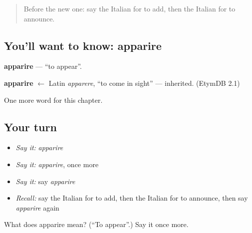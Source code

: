 \label{lesson:IT-C178-apparire}



\begin{quote}
Before the new one: say the Italian for to add, then the Italian for to announce.
\end{quote}

\subsection*{You'll want to know: apparire}
\textbf{apparire} — \textquotedblleft{}to appear\textquotedblright{}.

\begin{cousinweb}
\textbf{apparire} $\leftarrow$ Latin \emph{apparere}, \textquotedblleft{}to come in sight\textquotedblright{} — inherited. (EtymDB 2.1)
\end{cousinweb}

\begin{grammarlens}[title={What you've built}]
One more word for this chapter.
\end{grammarlens}

\subsection*{Your turn}
\begin{itemize}
\raggedright
  \item \emph{Say it:} \emph{apparire}
  \item \emph{Say it:} \emph{apparire}, once more
  \item \emph{Say it:} say \emph{apparire}
  \item \emph{Recall:} say the Italian for to add, then the Italian for to announce, then say \emph{apparire} again
\end{itemize}

\begin{tcolorbox}[breakable,colback=teal!4,colframe=teal!35!black,title={Before you move on}]
What does apparire mean? (\textquotedblleft{}To appear\textquotedblright{}.) Say it once more.
\end{tcolorbox}
